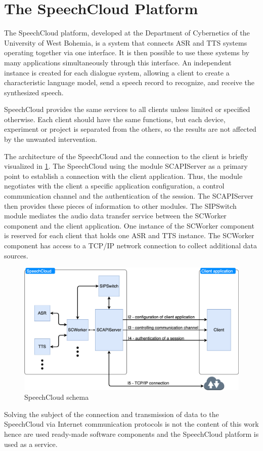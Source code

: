 \section{The SpeechCloud Platform}

The SpeechCloud platform, developed at the Department of Cybernetics of the University of West Bohemia, is a system that connects ASR and TTS systems operating together via one interface. It is then possible to use these systems by many applications simultaneously through this interface. An independent instance is created for each dialogue system, allowing a client to create a characteristic language model, send a speech record to recognize, and receive the synthesized speech.

SpeechCloud provides the same services to all clients unless limited or specified otherwise. Each client should have the same functions, but each device, experiment or project is separated from the others, so the results are not affected by the unwanted intervention.

The architecture of the SpeechCloud and the connection to the client is briefly visualized in \cref{fig:speechcloud_schema}. The SpeechCloud using the module SCAPIServer as a primary point to establish a connection with the client application. Thus, the module negotiates with the client a specific application configuration, a control communication channel and the authentication of the session. The SCAPIServer then provides these pieces of information to other modules. The SIPSwitch module mediates the audio data transfer service between the SCWorker component and the client application. One instance of the SCWorker component is reserved for each client that holds one ASR and TTS instance. The SCWorker component has access to a TCP/IP network connection to collect additional data sources.

\begin{figure}[H]
    \centering
    \includegraphics[width=\textwidth]{img/speechcloud_schema.png}
    \caption{SpeechCloud schema}
    \label{fig:speechcloud_schema}
\end{figure}

Solving the subject of the connection and transmission of data to the SpeechCloud via Internet communication protocols is not the content of this work hence are used ready-made software components and the SpeechCloud platform is used as a service.